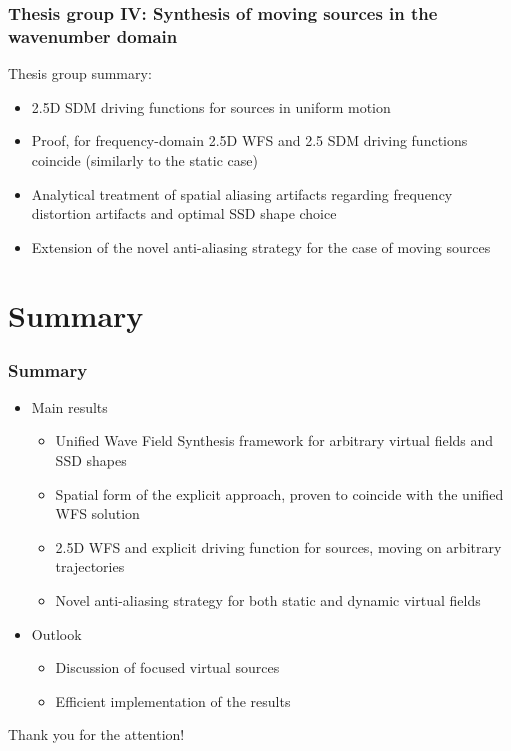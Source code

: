 \documentclass{beamer}
\begin{document}
\begin{frame}
\frametitle{Thesis group IV: Synthesis of moving sources in the wavenumber domain}
Thesis group summary:
	\vspace{3mm}	
	\begin{itemize}
	\item 2.5D SDM driving functions for sources in uniform motion
	\vspace{3mm}	
	\item Proof, for frequency-domain 2.5D WFS and 2.5 SDM driving functions coincide (similarly to the static case)
	\vspace{3mm}	
	\item Analytical treatment of spatial aliasing artifacts regarding frequency distortion artifacts and optimal SSD shape choice
	\vspace{3mm}	
	\item Extension of the novel anti-aliasing strategy for the case of moving sources
	\end{itemize}
\end{frame}

\section{Summary}
\begin{frame}
\frametitle{Summary}
\begin{itemize}
\item Main results
	\vspace{3mm}	
	\begin{itemize}
	\item Unified Wave Field Synthesis framework for arbitrary virtual fields and SSD shapes	\vspace{3mm}	
	\item Spatial form of the explicit approach, proven to coincide with the unified WFS solution 	\vspace{3mm}	
	\item 2.5D WFS and explicit driving function for sources, moving on arbitrary trajectories 	\vspace{3mm}	
	\item Novel anti-aliasing strategy for both static and dynamic virtual fields
	\end{itemize}
\item Outlook
	\begin{itemize}
	\item Discussion of focused virtual sources	\vspace{3mm}	
	\item Efficient implementation of the results
	\end{itemize}
\end{itemize}
\end{frame}



\begin{frame}
\Huge{\centerline{Thank you for the attention!}}
\end{frame}

\end{document}
